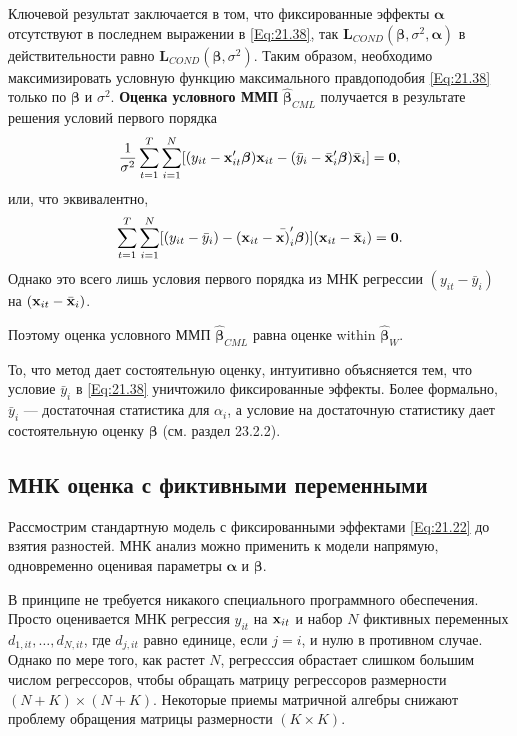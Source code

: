 Ключевой результат заключается в том, что фиксированные эффекты $\bm\alpha$ отсутствуют в последнем выражении в \ref{Eq:21.38}, так $\mathbf L_{COND}(\bm\beta, \sigma^2, \bm\alpha)$ в действительности равно $\mathbf L_{COND}(\bm\beta, \sigma^2)$. Таким образом, необходимо максимизировать условную функцию максимального правдоподобия \ref{Eq:21.38} только по $\bm\beta$ и $\sigma^2$. \textbf{Оценка условного ММП} $\hat{\bm\beta}_{CML}$ получается в результате решения условий первого порядка
\begin{align}
\frac{1}{\sigma^2} \sum^T_{t=1} \sum^N_{i=1} [(y_{it}-\mathbf{x}'_{it}\bm\beta)\mathbf{x}_{it}-(\bar{y}_i-\bar{\mathbf{x}}'_i\bm\beta)\bar{\mathbf{x}}_i]=\mathbf 0,
\nonumber
\end{align}
или, что эквивалентно,
 \begin{align}
 \sum^T_{t=1} \sum^N_{i=1} [(y_{it}-\bar{y}_i)-(\mathbf{x}_{it}-\bar{\mathbf{x})}'_i\bm\beta)]
(\mathbf{x}_{it}-\bar{\mathbf{x}}_i)=\mathbf 0.
\nonumber
\end{align}
Однако это всего лишь условия первого порядка из МНК регрессии $(y_{it}-\bar{y}_i)$ на $(\mathbf{x}_{it}-\bar{\mathbf{x}}_i)$.

Поэтому оценка условного ММП $\hat{\bm\beta}_{CML}$ равна оценке within $\hat{\bm\beta}_W$.

То, что метод дает состоятельную оценку, интуитивно объясняется тем, что условие $\bar{y}_i$ в \ref{Eq:21.38} уничтожило фиксированные эффекты. Более формально, $\bar{y}_i$ --- достаточная статистика для $\alpha_i$, а условие на достаточную статистику дает состоятельную оценку $\bm\beta$ (см. раздел 23.2.2).


\subsection{МНК оценка с фиктивными переменными}

Рассмострим стандартную модель с фиксированными эффектами \ref{Eq:21.22} до взятия разностей. МНК анализ можно применить к модели напрямую, одновременно оценивая параметры $\bm\alpha$ и $\bm\beta$.

В принципе не требуется никакого специального программного обеспечения. Просто оценивается МНК регрессия $y_{it}$ на $\mathbf{x}_{it}$ и набор $N$ фиктивных переменных $d_{1,it}, \dots, d_{N,it}$, где $d_{j,it}$ равно единице, если $j=i$, и нулю в противном случае. Однако по мере того, как растет $N$, регресссия обрастает слишком большим числом регрессоров, чтобы обращать матрицу регрессоров размерности $(N+K) \times (N + K)$. Некоторые приемы матричной алгебры снижают проблему обращения матрицы размерности $(K \times K)$.

